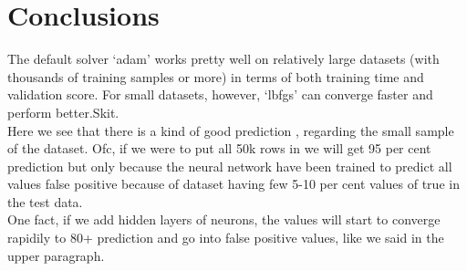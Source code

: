 \section{Conclusions}

\tab The default solver ‘adam’ works pretty well on relatively large datasets (with thousands of training samples or more) in terms of both training time and validation score. For small datasets, however, ‘lbfgs’ can converge faster and perform better.Skit.\\

\tab Here we see that there is a kind of good prediction , regarding the small sample of the dataset. Ofc, if we were to put all 50k rows in we will get 95 per cent prediction but only because the neural network have been trained to predict all values false positive because of dataset having few 5-10 per cent values of true in the test data.\\

\tab One fact, if we add hidden layers of neurons, the values will start to converge rapidily to 80+ prediction and go into false positive values, like we said in the upper paragraph.\\